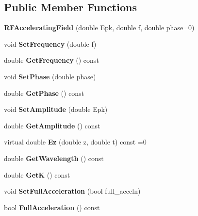 \subsection*{Public Member Functions}
\begin{DoxyCompactItemize}
\item 
\mbox{\label{classRFAcceleratingField_a724cce7e427fff7914c2af3f61f64a13}} 
{\bfseries R\+F\+Accelerating\+Field} (double Epk, double f, double phase=0)
\item 
\mbox{\label{classRFAcceleratingField_a6cb32e01d28405a5053a96057c2c89c5}} 
void {\bfseries Set\+Frequency} (double f)
\item 
\mbox{\label{classRFAcceleratingField_a3895f43b72bf12e15c7027b7495e814f}} 
double {\bfseries Get\+Frequency} () const
\item 
\mbox{\label{classRFAcceleratingField_a95b2baaecc2d4cfc9b5ae244557a81b1}} 
void {\bfseries Set\+Phase} (double phase)
\item 
\mbox{\label{classRFAcceleratingField_a4bc93ffa1995cb9f8c98e666c7df6e96}} 
double {\bfseries Get\+Phase} () const
\item 
\mbox{\label{classRFAcceleratingField_a0d0cb7e317f6b8c2b67a75fb1c8de6f3}} 
void {\bfseries Set\+Amplitude} (double Epk)
\item 
\mbox{\label{classRFAcceleratingField_acc4e840984df854ff49b2b34d6097f23}} 
double {\bfseries Get\+Amplitude} () const
\item 
\mbox{\label{classRFAcceleratingField_a5ace48c21ab38b73e5c195b771174854}} 
virtual double {\bfseries Ez} (double z, double t) const =0
\item 
\mbox{\label{classRFAcceleratingField_a2b97873ee152f024564968aff8dea197}} 
double {\bfseries Get\+Wavelength} () const
\item 
\mbox{\label{classRFAcceleratingField_a0d51545c0846113648afd22b92176462}} 
double {\bfseries GetK} () const
\item 
\mbox{\label{classRFAcceleratingField_a40da3dba20e53eaa95820096aeb9859b}} 
void {\bfseries Set\+Full\+Acceleration} (bool full\+\_\+acceln)
\item 
\mbox{\label{classRFAcceleratingField_afce56b04777b838f7543291d209d151c}} 
bool {\bfseries Full\+Acceleration} () const
\end{DoxyCompactItemize}
